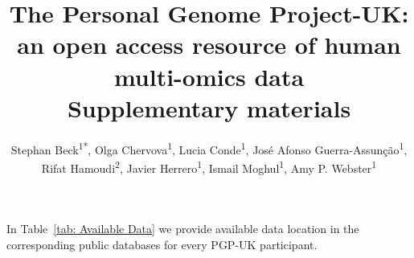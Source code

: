\documentclass[english]{article}
\begin{document}
\title{The Personal Genome Project-UK: an open access resource of human multi-omics data \\
\textbf{Supplementary materials}}
\author{Stephan Beck\textsuperscript{1{*}}, Olga Chervova\textsuperscript{1}, Lucia Conde\textsuperscript{1},
José Afonso Guerra-Assunção\textsuperscript{1},\\ Rifat Hamoudi\textsuperscript{2}, Javier Herrero\textsuperscript{1}, Ismail Moghul\textsuperscript{1}, Amy P. Webster\textsuperscript{1}}
\maketitle

In Table~\ref{tab: Available Data} we provide available data location in the corresponding public databases for every PGP-UK participant.
\end{document}
